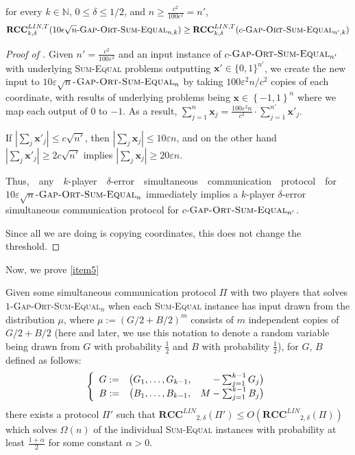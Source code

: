 \documentclass{toc}
\newcommand{\set}[1]{{\left \{{#1} \right \}}}
\newcommand{\zo}{\ensuremath{ \{ 0, 1 \} }}
\newcommand{\error}{\ensuremath{\delta}}
\newcommand{\gap}{\ensuremath{\varepsilon}}
\newcommand{\eqdef}{\ensuremath{:=}}
\newcommand{\rcclin}{\ensuremath{\mathbf{RCC}^{LIN}}}
\newcommand{\rcclinT}{\ensuremath{\mathbf{RCC}^{LIN,T}}}
\newcommand{\sumequal}{\textsc{Sum-Equal} }
\newcommand{\gose}{\textsc{Gap-Ort-Sum-Equal}}
\begin{document}
\begin{lemma}
for every $k \in \mathbb{N}$, $0 \le \delta \le 1/2$, and $n \ge \frac{c^2}{100\epsilon^2}=n'$,
$$\rcclinT_{k,\delta}(10\epsilon\sqrt{n}\text{-}\gose_{n,k}) \ge \rcclinT_{k,\delta}(c\text{-}\gose_{n',k})$$
\label{lemma:gap-ort reduction}
\end{lemma}

\begin{proof}[Proof of ]
	Given $n'=\frac{c^2}{100\gap^2}$ and 
	an input instance of $c$-$\gose_{n'}$ with underlying \sumequal problems outputting $\mathbf{x}'\in \zo^{n'}$, we create the new input to $10\gap\sqrt{n}$-$\gose_n$ by taking $100\gap^2 n / c^2$ copies of each coordinate, 
	with results of underlying problems being $\mathbf{x}\in\set{-1, 1}^n$ {\color{black}where we map each output of $0$ to $-1$. }
	As a result, $\sum_{j=1}^{n}\mathbf{x}_j  =  \frac{100\gap^2 n}{c^2}\cdot \sum_{j=1}^{n'}\mathbf{x}'_j$.

	If $|\sum_{j}\mathbf{x}'_j| \le c\sqrt{n'}$,
	then $|\sum_{j}\mathbf{x}_j| \le 10\gap n$,
	and on the other hand 
	$|\sum_{j}\mathbf{x}'_j| \ge 2c\sqrt{n'}$
	implies $|\sum_{j}\mathbf{x}_j| \ge 20\gap n$.

%
%
Thus,\ \ any\ \ $k$-player\ \ $\error$-error\ \ simultaneous\ \ 
communication\ \ protocol\ \ for\quad    %
$10\gap\sqrt{n}$-$\gose_n$ immediately implies a $k$-player $\error$-error simultaneous communication protocol for $c$-$\gose_{n'}$.
	 
Since all we are doing is copying coordinates, this does not change the threshold.
\end{proof}

{\color{black} Now, we prove \ref{item5}}  %

\begin{theorem}
Given some simultaneous communication protocol $\Pi$ with two players that solves $1$-\gose$_n$ when each \sumequal instance has input drawn from the distribution $\mu$, {\color{black}where $\mu \eqdef \left(G/2+B/2\right)^m$ consists of $m$ independent copies of $G/2+B/2$ (here and later, we use this notation to denote a random variable being drawn from $G$ with probability $\frac{1}{2}$ and $B$ with probability $\frac{1}{2}$),
	for $G$, $B$ defined as follows:
	$$
		\left\{
		\begin{array}{c c r}
			G \eqdef &	\big( G_1,\dots, G_{k-1} , &-\sum_{j=1}^{k-1} G_j \big)		\\
			B \eqdef &  \big( B_1,\dots, B_{k-1} , &M-\sum_{j=1}^{k-1} B_j \big)
		\end{array}		
		\right.
	$$
}
	there exists a protocol $\Pi'$ such that $\rcclin_{2,\delta}(\Pi') \le O(\rcclin_{2,\delta}(\Pi))$ which solves $\Omega(n)$ of the individual \sumequal instances with probability at least{ \color{black}$\frac{1+\alpha}{2}$ for some constant $\alpha>0$.}
\label{thm:gose complexity}
\end{theorem}
\end{document}
